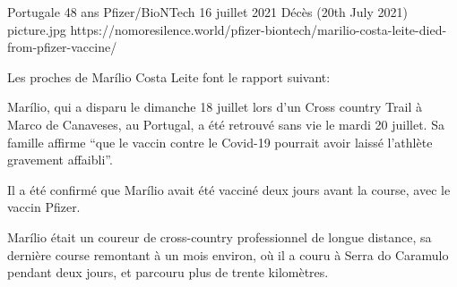 {Portugale}
{48 ans}
{Pfizer/BioNTech}
{16 juillet 2021}
{Décès (20th July 2021)}
{picture.jpg}
{https://nomoresilence.world/pfizer-biontech/marilio-costa-leite-died-from-pfizer-vaccine/}
{

Les proches de Marílio Costa Leite font le rapport suivant:

Marílio, qui a disparu le dimanche 18 juillet lors d'un Cross country Trail à
Marco de Canaveses, au Portugal, a été retrouvé sans vie le mardi 20 juillet. Sa
famille affirme “que le vaccin contre le Covid-19 pourrait avoir laissé
l'athlète gravement affaibli”.

Il a été confirmé que Marílio avait été vacciné deux jours avant la course, avec
le vaccin Pfizer.

Marílio était un coureur de cross-country professionnel de longue distance, sa
dernière course remontant à un mois environ, où il a couru à Serra do Caramulo
pendant deux jours, et parcouru plus de trente kilomètres.

}
